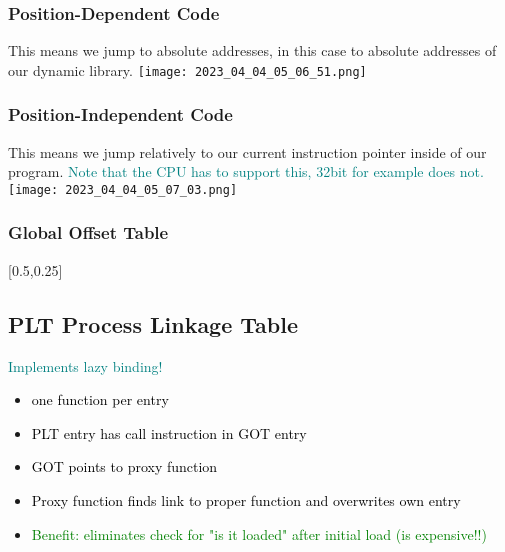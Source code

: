\documentclass[main.tex,fontsize=8pt,paper=a4,paper=portrait,DIV=calc,]{scrartcl}
\begin{document}
\subsubsection{Position-Dependent Code}
This means we jump to absolute addresses, in this case to absolute addresses of our dynamic library.\newline
\texttt{[image: 2023\_04\_04\_05\_06\_51.png]}

\subsubsection{Position-Independent Code}
This means we jump relatively to our current instruction pointer inside of our program.\newline
\textcolor{teal}{Note that the CPU has to support this, 32bit for example does not.}\newline
\texttt{[image: 2023\_04\_04\_05\_07\_03.png]}\newline

\subsubsection{Global Offset Table}
[0.5,0.25]

\subsection{PLT Process Linkage Table}
\textcolor{teal}{Implements lazy binding!}\newline
\begin{itemize}
\item \textcolor{black}{one function per entry}
\item \textcolor{black}{PLT entry has call instruction in GOT entry}
\item \textcolor{black}{GOT points to proxy function}
\item \textcolor{black}{Proxy function finds link to proper function and overwrites own entry}
\item \textcolor{green}{Benefit: eliminates check for "is it loaded" after initial load (is expensive!!)}
\end{itemize} 
\end{document}
